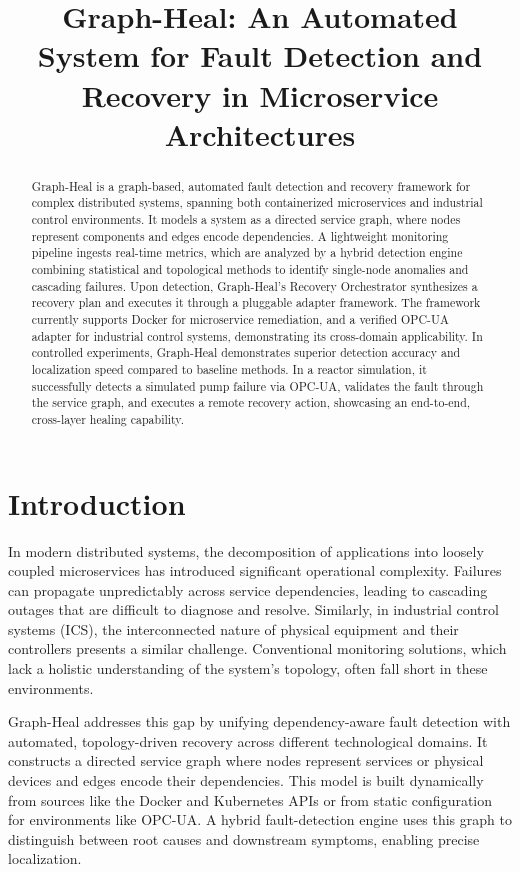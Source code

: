 \documentclass[11pt,conference]{IEEEtran}
\begin{document}
\title{Graph-Heal: An Automated System for Fault Detection and Recovery in Microservice Architectures}
\author{
}
\maketitle
\begin{abstract}
Graph-Heal is a graph-based, automated fault detection and recovery framework for complex distributed systems, spanning both containerized microservices and industrial control environments. It models a system as a directed service graph, where nodes represent components and edges encode dependencies. A lightweight monitoring pipeline ingests real-time metrics, which are analyzed by a hybrid detection engine combining statistical and topological methods to identify single-node anomalies and cascading failures. Upon detection, Graph-Heal's Recovery Orchestrator synthesizes a recovery plan and executes it through a pluggable adapter framework. The framework currently supports Docker for microservice remediation, and a verified OPC-UA adapter for industrial control systems, demonstrating its cross-domain applicability. In controlled experiments, Graph-Heal demonstrates superior detection accuracy and localization speed compared to baseline methods. In a reactor simulation, it successfully detects a simulated pump failure via OPC-UA, validates the fault through the service graph, and executes a remote recovery action, showcasing an end-to-end, cross-layer healing capability.
\end{abstract}

\section{Introduction}
In modern distributed systems, the decomposition of applications into loosely coupled microservices has introduced significant operational complexity. Failures can propagate unpredictably across service dependencies, leading to cascading outages that are difficult to diagnose and resolve. Similarly, in industrial control systems (ICS), the interconnected nature of physical equipment and their controllers presents a similar challenge. Conventional monitoring solutions, which lack a holistic understanding of the system's topology, often fall short in these environments.

Graph-Heal addresses this gap by unifying dependency-aware fault detection with automated, topology-driven recovery across different technological domains. It constructs a directed service graph where nodes represent services or physical devices and edges encode their dependencies. This model is built dynamically from sources like the Docker and Kubernetes APIs or from static configuration for environments like OPC-UA. A hybrid fault-detection engine uses this graph to distinguish between root causes and downstream symptoms, enabling precise localization.
\end{document}
